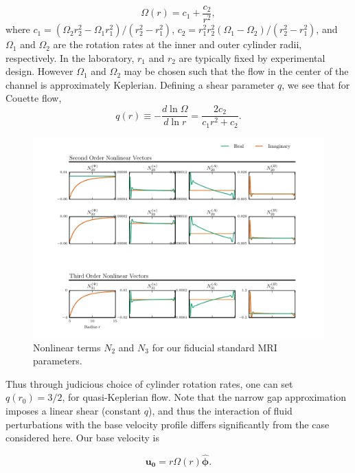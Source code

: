 \documentclass{emulateapj}
\newcommand{\beq}{\begin{equation}}
\newcommand{\eeq}{\end{equation}}
\newcommand{\phihat}{\ensuremath{\mathbf{\hat{\phi}}}}
\begin{document}
\begin{equation}
  \label{eq:couette_flow}
  \Omega(r) = c_1 + \frac{c_2}{r^2},
\end{equation}
where $c_1 = (\Omega_2 r^2_2 - \Omega_1 r^2_1)/(r^2_2 - r^2_1)$, $c_2 = r^2_1 r^2_2 (\Omega_1 - \Omega_2)/(r^2_2 - r^2_1)$, and $\Omega_1$ and $\Omega_2$ are the rotation rates at the inner and outer cylinder radii, respectively. In the laboratory, $r_1$ and $r_2$ are typically fixed by experimental design. However $\Omega_1$ and $\Omega_2$ may be chosen such that the flow in the center of the channel is approximately Keplerian. Defining a shear parameter $q$, we see that for Couette flow,
\begin{equation}
  \label{eq:couette_q}
  q(r) \equiv -\frac{d \ln \Omega}{d \ln r} = \frac{2 c_2}{c_1 r^2 + c_2}.
\end{equation}

\begin{figure}
\centering
\includegraphics[width=\textwidth]{../python/widegap/figures/nonlinear_2_3_widegap_fiducial_eigenfunctions.pdf}
\caption{Nonlinear terms $N_2$ and $N_3$ for our fiducial standard MRI parameters.}\label{fig:N2_N3}
\end{figure}

Thus through judicious choice of cylinder rotation rates, one can set $q(r_0) = 3/2$, for quasi-Keplerian flow. Note that the narrow gap approximation imposes a linear shear (constant $q$), and thus the interaction of fluid perturbations with the base velocity profile differs significantly from the case considered here. Our base velocity is 

\beq
\label{eq:baseu0}
\mathbf{u_0} = r\Omega(r) \phihat.
\eeq
\end{document}
